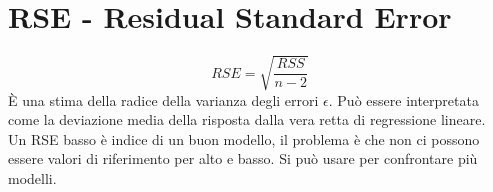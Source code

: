 \section{RSE - Residual Standard Error}
\[ RSE = \sqrt{\frac{RSS}{n - 2}} \]
\`E una stima della radice della varianza degli errori $\epsilon$. Pu\`o essere 
interpretata come la deviazione media della risposta dalla vera retta di 
regressione lineare.\\
Un RSE basso \`e indice di un buon modello, il problema \`e che non ci possono 
essere valori di riferimento per alto e basso.
Si può usare per confrontare più modelli.
